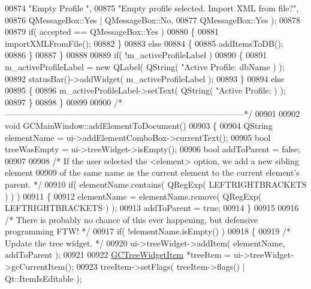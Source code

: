 \begin{DoxyCode}
{{{{00874                                                                  \textcolor{stringliteral}{"Empty Profile
      "},
00875                                                                  \textcolor{stringliteral}{"Empty profile
       selected. Import XML from file?"},
00876                                                                  
      QMessageBox::Yes | QMessageBox::No,
00877                                                                  
      QMessageBox::Yes );
00878 
00879     \textcolor{keywordflow}{if}( accepted == QMessageBox::Yes )
00880     \{
00881       importXMLFromFile();
00882     \}
00883     \textcolor{keywordflow}{else}
00884     \{
00885       addItemsToDB();
00886     \}
00887   \}
00888 
00889   \textcolor{keywordflow}{if}( !m\_activeProfileLabel )
00890   \{
00891     m\_activeProfileLabel = \textcolor{keyword}{new} QLabel( QString( \textcolor{stringliteral}{"Active Profile: %
      dbName ) );
00892     statusBar()->addWidget( m\_activeProfileLabel );
00893   \}
00894   \textcolor{keywordflow}{else}
00895   \{
00896     m\_activeProfileLabel->setText( QString( \textcolor{stringliteral}{"Active Profile: %
      ) );
00897   \}
00898 \}
00899 
00900 \textcolor{comment}{/*
      --------------------------------------------------------------------------------------*/}
00901 
00902 \textcolor{keywordtype}{void} GCMainWindow::addElementToDocument()
00903 \{
00904   QString elementName = ui->addElementComboBox->currentText();
00905   \textcolor{keywordtype}{bool} treeWasEmpty = ui->treeWidget->isEmpty();
00906   \textcolor{keywordtype}{bool} addToParent = \textcolor{keyword}{false};
00907 
00908   \textcolor{comment}{/* If the user selected the <element> option, we add a new sibling element}
00909 \textcolor{comment}{    of the same name as the current element to the current element's parent. */}
00910   \textcolor{keywordflow}{if}( elementName.contains( QRegExp( LEFTRIGHTBRACKETS ) ) )
00911   \{
00912     elementName = elementName.remove( QRegExp( LEFTRIGHTBRACKETS ) );
00913     addToParent = \textcolor{keyword}{true};
00914   \}
00915 
00916   \textcolor{comment}{/* There is probably no chance of this ever happening, but defensive
       programming FTW! */}
00917   \textcolor{keywordflow}{if}( !elementName.isEmpty() )
00918   \{
00919     \textcolor{comment}{/* Update the tree widget. */}
00920     ui->treeWidget->addItem( elementName, addToParent );
00921 
00922     \hyperlink{class_g_c_tree_widget_item}{GCTreeWidgetItem} *treeItem = ui->treeWidget->gcCurrentItem();
00923     treeItem->setFlags( treeItem->flags() | Qt::ItemIsEditable );
}}}}}}
\end{DoxyCode}
